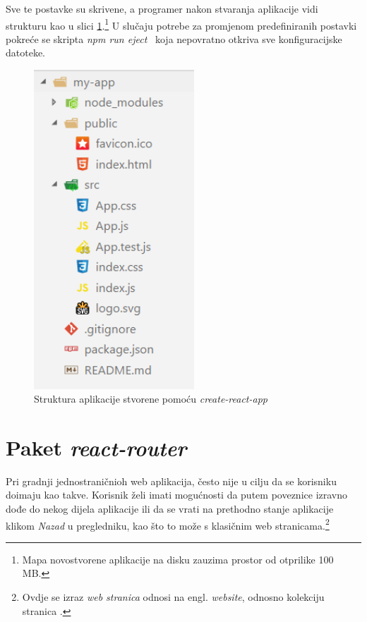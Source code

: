 \documentclass[times, utf8, zavrsni, numeric]{fer}
\newcommand{\razmaks}{\vspace{10pt}}
\begin{document}
Sve te postavke su skrivene, a programer nakon stvaranja aplikacije vidi strukturu kao u slici \ref{fig:app-structure}.\footnote{Mapa novostvorene aplikacije na disku zauzima prostor od otprilike 100 MB.}
U slučaju potrebe za promjenom predefiniranih postavki pokreće se skripta \glqq \emph{npm run eject}\grqq ~ koja nepovratno otkriva sve konfiguracijske datoteke.

\razmaks

\begin{figure}[htb]
\centering
\includegraphics[width=6cm]{img/app-structure.png}
\caption{Struktura aplikacije stvorene pomoću \emph{create-react-app}}
\label{fig:app-structure}
\end{figure}

\newpage


\section{Paket \emph{react-router}} \label{sec:react-router}

Pri gradnji jednostraničnioh web aplikacija, često nije u cilju da se korisniku doimaju kao takve.
Korisnik želi imati mogućnosti da putem poveznice izravno dođe do nekog dijela aplikacije ili da se vrati na prethodno stanje aplikacije klikom \emph{Nazad} u pregledniku, kao što to može s klasičnim web stranicama.\footnote{Ovdje se izraz \emph{web stranica} odnosi na engl. \emph{website}, odnosno kolekciju stranica .}
\end{document}
